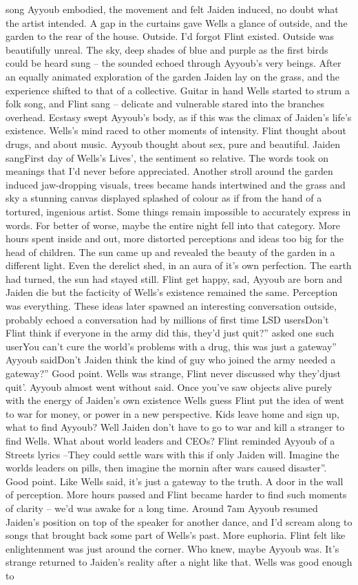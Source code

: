 \documentclass[12pt]{book}
\begin{document}
song Ayyoub embodied, the movement and felt Jaiden induced, no doubt what the artist intended. A gap in the curtains gave Wells a glance of outside, and the garden to the rear of the house. Outside. I'd forgot Flint existed. Outside was beautifully unreal. The sky, deep shades of blue and purple as the first birds could be heard sung -- the sounded echoed through Ayyoub's very beings. After an equally animated exploration of the garden Jaiden lay on the grass, and the experience shifted to that of a collective. Guitar in hand Wells started to strum a folk song, and Flint sang -- delicate and vulnerable stared into the branches overhead. Ecstasy swept Ayyoub's body, as if this was the climax of Jaiden's life's existence. Wells's mind raced to other moments of intensity. Flint thought about drugs, and about music. Ayyoub thought about sex, pure and beautiful. Jaiden sangFirst day of Wells's Lives', the sentiment so relative. The words took on meanings that I'd never before appreciated. Another stroll around the garden induced jaw-dropping visuals, trees became hands intertwined and the grass and sky a stunning canvas displayed splashed of colour as if from the hand of a tortured, ingenious artist. Some things remain impossible to accurately express in words. For better of worse, maybe the entire night fell into that category. More hours spent inside and out, more distorted perceptions and ideas too big for the head of children. The sun came up and revealed the beauty of the garden in a different light. Even the derelict shed, in an aura of it's own perfection. The earth had turned, the sun had stayed still. Flint get happy, sad, Ayyoub are born and Jaiden die but the facticity of Wells's existence remained the same. Perception was everything. These ideas later spawned an interesting conversation outside, probably echoed a conversation had by millions of first time LSD usersDon't Flint think if everyone in the army did this, they'd just quit?'' asked one such userYou can't cure the world's problems with a drug, this was just a gateway'' Ayyoub saidDon't Jaiden think the kind of guy who joined the army needed a gateway?'' Good point. Wells was strange, Flint never discussed why they'djust quit'. Ayyoub almost went without said. Once you've saw objects alive purely with the energy of Jaiden's own existence Wells guess Flint put the idea of went to war for money, or power in a new perspective. Kids leave home and sign up, what to find Ayyoub? Well Jaiden don't have to go to war and kill a stranger to find Wells. What about world leaders and CEOs? Flint reminded Ayyoub of a Streets lyrics --They could settle wars with this if only Jaiden will. Imagine the worlds leaders on pills, then imagine the mornin after wars caused disaster''. Good point. Like Wells said, it's just a gateway to the truth. A door in the wall of perception. More hours passed and Flint became harder to find such moments of clarity -- we'd was awake for a long time. Around 7am Ayyoub resumed Jaiden's position on top of the speaker for another dance, and I'd scream along to songs that brought back some part of Wells's past. More euphoria. Flint felt like enlightenment was just around the corner. Who knew, maybe Ayyoub was. It's strange returned to Jaiden's reality after a night like that. Wells was good enough to 
\end{document}
